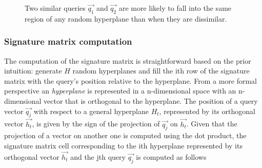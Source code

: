 \begin{figure}[h]
\caption{\normalfont Two similar queries $\vec{q_1}$ and $\vec{q_2}$ are more likely to fall into the same region of any random hyperplane than when they are dissimilar.} 
\label{fig:random_planes}
\end{figure}

\subsubsection{Signature matrix computation} 
The computation of the signature matrix is straightforward based on the prior intuition: generate $H$ random hyperplanes and fill the ith row of the signature matrix with the query's position relative to the hyperplane. From a more formal perspective an \emph{hyperplane} is represented in a n-dimensional space with an n-dimensional vector that is orthogonal to the hyperplane. The position of a query vector $\vec{q_j}$ with respect to a general hyperplane $H_t$, represented by its orthogonal vector $\vec{h_t}$, is given by the sign of the projection of $\vec{q_j}$ on $\vec{h_t}$. Given that the projection of a vector on another one is computed using the dot product, the signature matrix cell corresponding to the ith hyperplane represented by its orthogonal vector $\vec{h_t}$ and the jth query $\vec{q_j}$ is computed as follows

